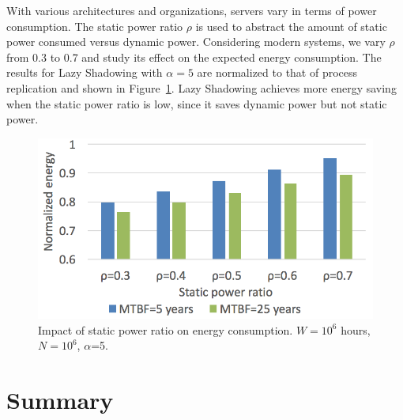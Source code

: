 With various architectures and organizations, servers
vary in terms of
power consumption. The static power ratio $\rho$ is used to abstract the
amount of static power consumed versus dynamic power. 
Considering modern systems, we vary $\rho$ from 0.3 to 0.7 and study its effect
on the expected energy consumption. The results for Lazy Shadowing with $\alpha=5$ are normalized to that of process replication and shown in 
Figure~\ref{fig:power_ratio}. 
Lazy Shadowing achieves
more energy saving when the static power ratio is low, since it saves dynamic 
power but not static power. %

\begin{figure}[!t]
	\begin{center}
		\includegraphics[width=0.7\columnwidth]{Figures/ts_power_5}
	\end{center}
	\caption{Impact of static power ratio on energy consumption. $W=10^6$ hours, $N=10^6$, $\alpha$=5.}
	\label{fig:power_ratio}
\end{figure}

\section{Summary}


